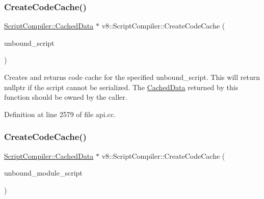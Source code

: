 \subsubsection{\texorpdfstring{Create\+Code\+Cache()}{CreateCodeCache()}\hspace{0.1cm}{\footnotesize\ttfamily [1/2]}}
{\footnotesize\ttfamily \mbox{\hyperlink{structv8_1_1ScriptCompiler_1_1CachedData}{Script\+Compiler\+::\+Cached\+Data}} $\ast$ v8\+::\+Script\+Compiler\+::\+Create\+Code\+Cache (\begin{DoxyParamCaption}\item[{\mbox{\hyperlink{classv8_1_1Local}{Local}}$<$ \mbox{\hyperlink{classv8_1_1UnboundScript}{Unbound\+Script}} $>$}]{unbound\+\_\+script }\end{DoxyParamCaption})\hspace{0.3cm}{\ttfamily [static]}}

Creates and returns code cache for the specified unbound\+\_\+script. This will return nullptr if the script cannot be serialized. The \mbox{\hyperlink{structv8_1_1ScriptCompiler_1_1CachedData}{Cached\+Data}} returned by this function should be owned by the caller. 

Definition at line 2579 of file api.\+cc.

\mbox{\label{classv8_1_1ScriptCompiler_a5639eedf1af1c8a9456eb5d0a07ddf8a}} 
\subsubsection{\texorpdfstring{Create\+Code\+Cache()}{CreateCodeCache()}\hspace{0.1cm}{\footnotesize\ttfamily [2/2]}}
{\footnotesize\ttfamily \mbox{\hyperlink{structv8_1_1ScriptCompiler_1_1CachedData}{Script\+Compiler\+::\+Cached\+Data}} $\ast$ v8\+::\+Script\+Compiler\+::\+Create\+Code\+Cache (\begin{DoxyParamCaption}\item[{\mbox{\hyperlink{classv8_1_1Local}{Local}}$<$ \mbox{\hyperlink{classv8_1_1UnboundModuleScript}{Unbound\+Module\+Script}} $>$}]{unbound\+\_\+module\+\_\+script }\end{DoxyParamCaption})\hspace{0.3cm}{\ttfamily [static]}}

